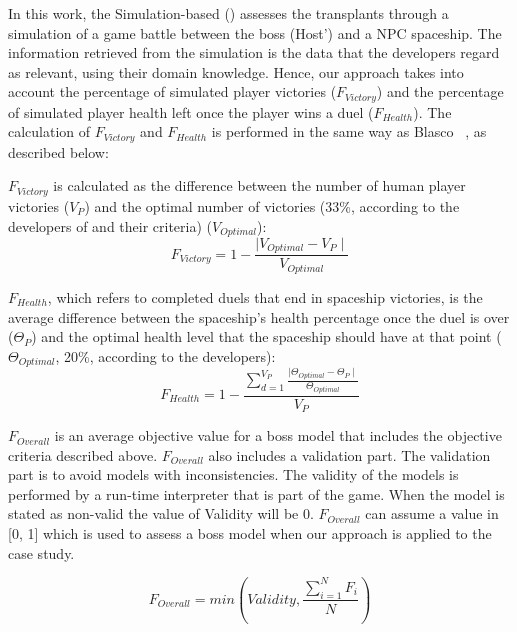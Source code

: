 In this work, the Simulation-based \ApproachName{} (\simhotep{}) assesses the transplants through a simulation of a game battle between the boss (Host') and a NPC spaceship. The information retrieved from the simulation is the data that the developers regard as relevant, using their domain knowledge. Hence, our approach takes into account  the percentage of simulated player victories ($F_{Victory}$) and the percentage of simulated player health left once the player wins a duel ($F_{Health}$).
The calculation of $F_{Victory}$ and $F_{Health}$ is performed in the same way as Blasco \etal~\cite{blasco2021evolutionary}, as described below:

$F_{Victory}$ is calculated as the difference between the number of human player victories ($V_{P}$) and the optimal number of victories (33\%, according to the developers of \CaseStudy{} and their criteria) ($V_{Optimal}$):
\begin{equation}
F_{Victory} = 1 -\frac{\mid V_{Optimal} - V_{P} \mid}{ V_{Optimal}}
\end{equation}

$F_{Health}$, which refers to completed duels that end in spaceship victories, is the average difference between the spaceship's health percentage once the duel is over ($\Theta_{P}$) and the optimal health level that the spaceship should have at that point ($\Theta_{Optimal}$, 20\%, according to the developers):
\begin{equation}
F_{Health} = 1 - \frac{\sum\limits_{d=1}^{V_{P}}\frac{\mid \Theta_{Optimal} - \Theta_{P} \mid}{ \Theta_{Optimal}}}{V_{P}}
\end{equation}

$F_{Overall}$ is an average objective value for a boss model that includes the objective criteria described above. $F_{Overall}$ also includes a validation part. The validation part is to avoid models with inconsistencies. The validity of the models is performed by a run-time interpreter that is part of the game. When the model is stated as non-valid the value of Validity will be 0. $F_{Overall}$ can assume a value in [0, 1] which is used to assess a boss model when our \ApproachName{} approach is applied to the \CaseStudy{} case study.

\begin{equation}
F_{Overall} = min \left ( Validity, \frac{\sum\limits_{i=1}^{N}F_{i}}{N} \right )
\end{equation}



